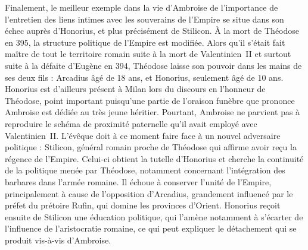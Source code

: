 \bigskip

Finalement, le meilleur exemple dans la vie d'Ambroise de l'importance de l'entretien des liens intimes avec les souverains de l'Empire se situe dans son échec auprès d'Honorius, et plus précisément de Stilicon. À la mort de Théodose en 395, la structure politique de l'Empire est modifiée. Alors qu'il s'était fait maître de tout le territoire romain suite à la mort de Valentinien~II et surtout suite à la défaite d'Eugène en 394, Théodose laisse son pouvoir dans les mains de ses deux fils : Arcadius âgé de 18 ans, et Honorius, seulement âgé de 10 ans. Honorius est d'ailleurs présent à Milan lors du discours en l'honneur de Théodose, point important puisqu'une partie de l'oraison funèbre que prononce Ambroise est dédiée au très jeune héritier. Pourtant, Ambroise ne parvient pas à reproduire le schéma de proximité paternelle qu'il avait employé avec Valentinien~II. L'évêque doit à ce moment faire face à un nouvel adversaire politique : Stilicon, général romain proche de Théodose qui affirme avoir reçu la régence de l'Empire. Celui-ci obtient la tutelle d'Honorius et cherche la continuité de la politique menée par Théodose, notamment concernant l'intégration des barbares dans l'armée romaine. Il échoue à conserver l'unité de l'Empire, principalement à cause de l'opposition d'Arcadius, grandement influencé par le préfet du prétoire Rufin, qui domine les provinces d'Orient\autocite{mazzarino_stilicone_1942}. Honorius reçoit ensuite de Stilicon une éducation politique, qui l'amène notamment à s'écarter de l'influence de l'aristocratie romaine, ce qui peut expliquer le détachement qui se produit vis-à-vis d'Ambroise.

\bigskip

